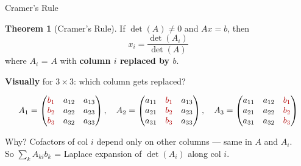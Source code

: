 \documentclass[10pt]{beamer}
\theoremstyle{definition}
\newtheorem{thm}{Theorem}[section]
\newcommand{\x}[1]{\alert{\textbf{#1}}}
\newcommand{\rd}[1]{{\color{red!70!black}#1}}
\begin{document}
\begin{frame}{Cramer's Rule}

\begin{thm}[Cramer's Rule]
If $\det(A) \neq 0$ and $Ax = b$, then
$$\boxed{x_i = \frac{\det(A_i)}{\det(A)}}$$
where $A_i$ = $A$ with \x{column $i$ replaced by $b$}.
\end{thm}

\vfill

\textbf{Visually} for $3\times 3$: which column gets replaced?

{\small
$$A_1 = \begin{pmatrix}\rd{b_1}&a_{12}&a_{13}\\\rd{b_2}&a_{22}&a_{23}\\\rd{b_3}&a_{32}&a_{33}\end{pmatrix},\quad
A_2 = \begin{pmatrix}a_{11}&\rd{b_1}&a_{13}\\a_{21}&\rd{b_2}&a_{23}\\a_{31}&\rd{b_3}&a_{33}\end{pmatrix},\quad
A_3 = \begin{pmatrix}a_{11}&a_{12}&\rd{b_1}\\a_{21}&a_{22}&\rd{b_2}\\a_{31}&a_{32}&\rd{b_3}\end{pmatrix}$$
}

\vfill

{\footnotesize Why? Cofactors of col $i$ depend only on other columns --- same in $A$ and $A_i$.\\
So $\sum_k A_{ki} b_k$ = Laplace expansion of $\det(A_i)$ along col $i$.}

\end{frame}
\end{document}

